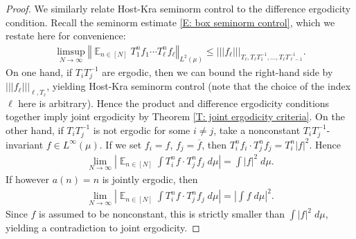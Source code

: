 \documentclass[11pt]{amsart}
\theoremstyle{definition}
\DeclareMathOperator*{\E}{\mathbb{E}}
\newcommand{\CX}{{\mathcal X}}
\newcommand{\norm}[1]{\left\Vert #1\right\Vert}
\newcommand{\nnorm}[1]{\lvert\!|\!| #1|\!|\!\rvert}
\newcommand{\inv}{^{-1}}
\newcommand{\1}{{\mathbf{1}}}
\newcommand{\abs}[1]{\mathopen{}\left| #1\mathclose{}\right|}
\begin{document}
\begin{proof}
        We similarly relate Host-Kra seminorm control to the difference ergodicity condition.
        Recall the seminorm estimate \eqref{E: box seminorm control}, which we restate here for convenience:
        \begin{align*}%
            \limsup_{N\to\infty}\norm{\E_{n\in[N]} T_1^n f_1 \cdots T_\ell^n f_\ell}_{L^2(\mu)} \leq \nnorm{f_\ell}_{T_\ell, T_\ell T_1\inv, \ldots, T_\ell T_{\ell-1}\inv}.
        \end{align*}
        On one hand, if $T_iT_j\inv$ are ergodic, then we can bound the right-hand side by $\nnorm{f_\ell}_{\ell, T_\ell}$, yielding Host-Kra seminorm control (note that the choice of the index $\ell$ here is arbitrary). Hence the product and difference ergodicity conditions together imply joint ergodicity by Theorem \ref{T: joint ergodicity criteria}. On the other hand, if $T_iT_j\inv$ is not ergodic for some $i\neq j$, take a nonconstant $T_iT_j\inv$-invariant $f\in L^\infty(\mu)$. 
        If we set $f_i = f$, $f_j = \overline{f}$, then $T_i^n f_i \cdot T_j^n f_j = T_i^n|f|^2$. Hence
        \begin{align*}
            \lim_{N\to\infty} \abs{\E_{n\in[N]}\int T_i^n f \cdot T_j^n f_j\; d\mu} %
            = \int |f|^2\; d\mu.
        \end{align*}
        If however $a(n) = n$ is jointly ergodic, then 
                \begin{align*}
            \lim_{N\to\infty} \abs{\E_{n\in[N]}\int T_i^n f \cdot T_j^n f_j\; d\mu} 
            = \abs{\int f\; d\mu}^2.
        \end{align*}
        Since $f$ is assumed to be nonconstant, this is strictly smaller than $\int |f|^2\; d\mu$, yielding a contradiction to joint ergodicity.
    \end{proof}
\end{document}
